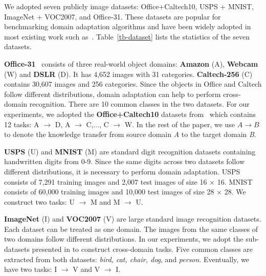 \documentclass[sigconf]{acmart}
\begin{document}
We adopted seven publicly image datasets: Office+Caltech10, USPS + MNIST, ImageNet + VOC2007, and Office-31. These datasets are popular for benchmarking domain adaptation algorithms and have been widely adopted in most existing work such as~\cite{gong2012geodesic,long2014adaptation,zhang2017joint,zhuo2017deep}. Table~\ref{tb-dataset} lists the statistics of the seven datasets.

\textbf{Office-31}~\cite{saenko2010adapting} consists of three real-world object domains: \textbf{Amazon} (A), \textbf{Webcam} (W) and \textbf{DSLR} (D). It has 4,652 images with 31 categories. \textbf{Caltech-256} (C) contains 30,607 images and 256 categories. Since the objects in Office and Caltech follow different distributions, domain adaptation can help to perform cross-domain recognition. There are 10 common classes in the two datasets. For our experiments, we adopted the \textbf{Office+Caltech10} datasets from~\cite{gong2012geodesic} which contains 12 tasks: A $\rightarrow$ D, A $\rightarrow$ C,..., C $\rightarrow$ W. In the rest of the paper, we use $A \rightarrow B$ to denote the knowledge transfer from source domain \textit{A} to the target domain \textit{B}.

\textbf{USPS} (U) and \textbf{MNIST} (M) are standard digit recognition datasets containing handwritten digits from 0-9. Since the same digits across two datasets follow different distributions, it is necessary to perform domain adaptation. USPS consists of 7,291 training images and 2,007 test images of size 16 $\times$ 16. MNIST consists of 60,000 training images and 10,000 test images of size 28 $\times$ 28. We construct two tasks: U $\rightarrow$ M and M $\rightarrow$ U. 

\textbf{ImageNet} (I) and \textbf{VOC2007} (V) are large standard image recognition datasets. Each dataset can be treated as one domain. The images from the same classes of two domains follow different distributions. In our experiments, we adopt the sub-datasets presented in \cite{fang2013unbiased} to construct cross-domain tasks. Five common classes are extracted from both datasets: \textit{bird, cat, chair, dog}, and \textit{person}. Eventually, we have two tasks: I $\rightarrow$ V and V $\rightarrow$ I.
 
\end{document}
